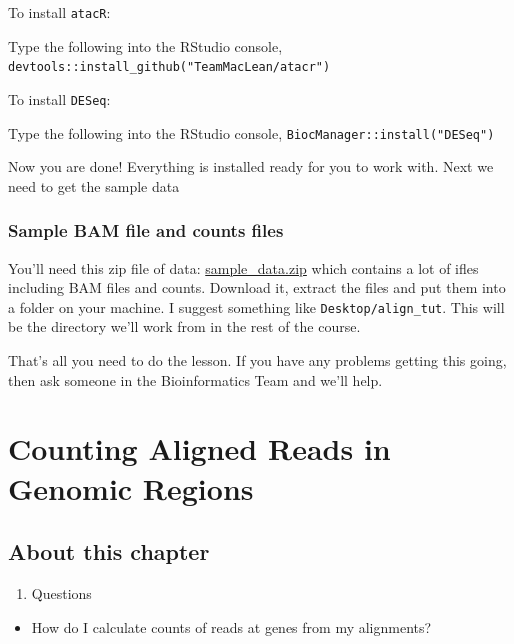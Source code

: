 \documentclass[]{book}
\providecommand{\tightlist}{%
  \setlength{\itemsep}{0pt}\setlength{\parskip}{0pt}}
\begin{document}
To install \texttt{atacR}:

Type the following into the RStudio console, \texttt{devtools::install\_github("TeamMacLean/atacr")}

To install \texttt{DESeq}:

Type the following into the RStudio console, \texttt{BiocManager::install("DESeq")}

Now you are done! Everything is installed ready for you to work with. Next we need to get the sample data

\hypertarget{sample-bam-file-and-counts-files}{%
\subsection{Sample BAM file and counts files}\label{sample-bam-file-and-counts-files}}

You'll need this zip file of data: \href{https://github.com/TeamMacLean/minimal_quantitative_rnaseq/blob/master/sample_data/sample_data.zip}{sample\_data.zip} which contains a lot of ifles including BAM files and counts. Download it, extract the files and put them into a folder on your machine. I suggest something like \texttt{Desktop/align\_tut}. This will be the directory we'll work from in the rest of the course.

That's all you need to do the lesson. If you have any problems getting this going, then ask someone in the Bioinformatics Team and we'll help.

\hypertarget{intro}{%
\chapter{Counting Aligned Reads in Genomic Regions}\label{intro}}

\hypertarget{about-this-chapter}{%
\section{About this chapter}\label{about-this-chapter}}

\begin{enumerate}
\def\labelenumi{\arabic{enumi}.}
\tightlist
\item
  Questions
\end{enumerate}

\begin{itemize}
\tightlist
\item
  How do I calculate counts of reads at genes from my alignments?
\end{itemize}
\end{document}
